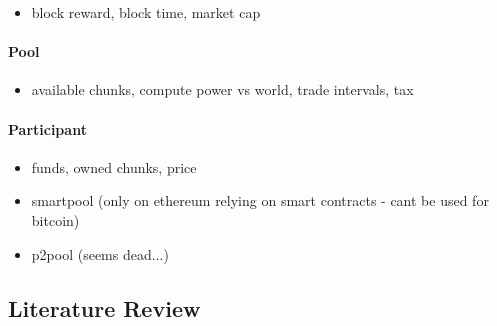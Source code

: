 \begin{itemize}
  \item block reward, block time, market cap
\end{itemize}

\paragraph{Pool}

\begin{itemize}
  \item available chunks, compute power vs world, trade intervals, tax
\end{itemize}

\paragraph{Participant}

\begin{itemize}
  \item funds, owned chunks, price
\end{itemize}

\begin{itemize}
  \item smartpool (only on ethereum relying on smart contracts - cant be used for bitcoin)
  \item p2pool (seems dead...)
\end{itemize}

\subsection{Literature Review}